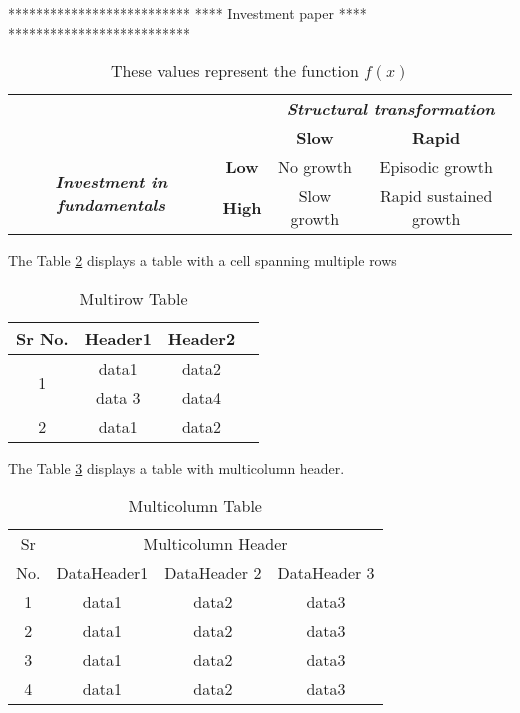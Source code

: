 **************************
**** Investment paper ****
**************************

\begin{table}[H]
\def\arraystretch {1.5}
\centering


\begin{tabular}{|c|c|c|c|}
\hline 
\hline 
\multicolumn{2}{|c|}{} & \multicolumn{2}{|c|}{\textbf{\textit{Structural transformation}}} \\ 
\cline{3-4} 
\multicolumn{2}{|c|}{} & \textbf{Slow} & \textbf{Rapid} \\ 
\hline 
\multirow{2}{*}{\textbf{\textit{Investment in fundamentals}}}  & \textbf{Low} &  No growth & Episodic growth \\ 
\cline{2-4}
											& \textbf{High}  & Slow growth & Rapid sustained growth \\ 
\hline
\hline 
\end{tabular} 

\caption{These values represent the function $f(x)$}
\label{tab: data 1}
\end{table}


The Table \ref{multirow_table} displays a table with a cell spanning multiple rows

		\begin{table} [ht]
			\centering
			\scalebox{1.5}
			{
			\begin{tabular}{|c|c|c|c|}
			\hline
			Sr No. & Header1 & Header2 \\
			\hline
			\multirow{2}{*}{1} & data1 & data2 \\
									 & data 3 & data4 \\
			\hline
			2 & data1 & data2 \\
			\hline
			\end{tabular}						
			}
			\caption{Multirow Table}
			\label{multirow_table}
		\end{table}


The Table \ref{multicolumn_table} displays a table with multicolumn header. 

\begin{table} [ht]
	\centering
	\begin{tabular}{|c|c|c|c|}
		\hline
		Sr & \multicolumn{3}{c|}{Multicolumn Header} \\
		\cline{2-4}
		No. & DataHeader1 & DataHeader 2 & DataHeader 3 \\
		\hline 
		1 & data1 & data2 & data3 \\
		\hline
		2 & data1 & data2 & data3 \\
		\hline
		3 & data1 & data2 & data3 \\
		\hline
		4 & data1 & data2 & data3 \\
		\hline
	\end{tabular}
	\caption{Multicolumn Table}
	\label{multicolumn_table}
\end{table}





